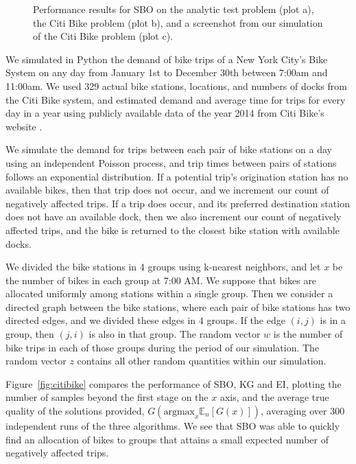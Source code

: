 \documentclass{article}
\newcommand{\w}{w}
\newcommand{\z}{z}
\begin{document}
\begin{figure}[!htb]
\caption{Performance results for SBO on the analytic test problem (plot a), the Citi Bike problem (plot b), and a screenshot from our simulation of the Citi Bike problem (plot c).
    \label{fig:stuff}}
\end{figure}


We simulated in Python the demand of bike trips of a New York City's Bike System on any day from January 1st to December 30th between 7:00am and 11:00am. We used 329 actual bike stations, locations, and numbers of docks from the Citi Bike system, and estimated demand and average time for trips for every day in a year using publicly available data of the year 2014 from Citi Bike's website \cite{citibike}.


We simulate the demand for trips between each pair of bike stations on a day using an independent Poisson process, and trip times between pairs of stations follows an exponential distribution. 
If a potential trip's origination station has no available bikes, then that trip does not occur, and we increment our count of negatively affected trips.  If a trip does occur, and its preferred destination station does not have an available dock, then we also increment our count of negatively affected trips, and the bike is returned to the closest bike station with available docks.

We divided the bike stations in $4$ groups using k-nearest neighbors, and let $x$ be the number of bikes in each group at 7:00 AM. We suppose that bikes are allocated uniformly among stations within a single group.  Then we consider a directed graph between the bike stations, where each pair of bike stations has two directed edges, and we divided these edges in $4$ groups. If the edge $(i,j)$ is in a group, then $(j,i)$ is also in that group. The random vector $\w$ is the number of bike trips in each of those groups during the period of our simulation. The random vector $\z$ contains all other random quantities within our simulation.

Figure~\ref{fig:citibike} compares the performance of SBO, KG and EI, plotting the number of samples beyond the first stage on the $x$ axis, and the average true quality of the solutions provided, $G(\mathrm{argmax}_x \mathbb{E}_n[G(x)])$, averaging over 300 independent runs of the three algorithms. We see that SBO was able to quickly find an allocation of bikes to groups that attains a small expected number of negatively affected trips.
\end{document}
